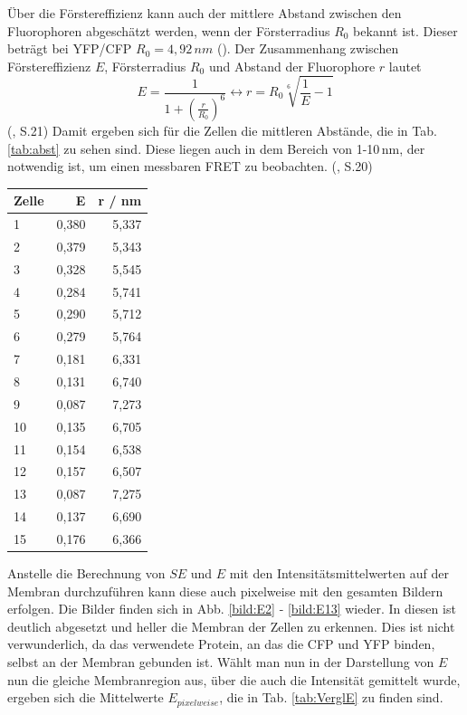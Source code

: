 Über die Förstereffizienz kann auch der mittlere Abstand zwischen den Fluorophoren abgeschätzt werden, wenn der Försterradius $R_0$ bekannt ist. 
Dieser beträgt bei YFP/CFP $R_0 = 4,92\,nm$ (\cite{Patterson2000}). Der Zusammenhang zwischen Förstereffizienz $E$, Försterradius $R_0$ und Abstand der Fluorophore $r$ 
lautet 
\begin{equation*}
    E = \frac{1}{1+(\frac{r}{R_0})^6} \leftrightarrow r = R_0 \sqrt[6]{\frac{1}{E} -1} 
\end{equation*}
(\cite{Zuern2009}, S.21)
Damit ergeben sich für die Zellen die mittleren Abstände, die in Tab. \ref{tab:abst} zu sehen sind. Diese liegen auch in dem Bereich von 
1-10\,nm, der notwendig ist, um einen messbaren FRET zu beobachten. (\cite{Zuern2009}, S.20)

\begin{center}
    \centering
    \begin{tabular}{lrr}
        \toprule
        Zelle &     E &     r / nm \\
        \midrule
        1     & 0,380 & 5,337 \\
        2     & 0,379 & 5,343 \\
        3     & 0,328 & 5,545 \\
        4     & 0,284 & 5,741 \\
        5     & 0,290 & 5,712 \\
        6     & 0,279 & 5,764 \\
        7     & 0,181 & 6,331 \\
        8     & 0,131 & 6,740 \\
        9     & 0,087 & 7,273 \\
        10    & 0,135 & 6,705 \\
        11    & 0,154 & 6,538 \\
        12    & 0,157 & 6,507 \\
        13    & 0,087 & 7,275 \\
        14    & 0,137 & 6,690 \\
        15    & 0,176 & 6,366 \\
        \bottomrule
    \end{tabular}
\end{center}



Anstelle die Berechnung von $SE$ und $E$ mit den Intensitätsmittelwerten auf der Membran durchzuführen kann diese auch pixelweise 
mit den gesamten Bildern erfolgen. Die Bilder finden sich in Abb. \ref{bild:E2} - \ref{bild:E13} wieder. In diesen ist deutlich abgesetzt 
und heller die Membran der Zellen zu erkennen. Dies ist nicht verwunderlich, da das verwendete Protein, an das die CFP und YFP binden, selbst 
an der Membran gebunden ist.
Wählt man nun in der Darstellung von $E$ nun die gleiche 
Membranregion aus, über die auch die Intensität gemittelt wurde, ergeben sich die Mittelwerte $E_{pixelweise}$, die in Tab. \ref{tab:VerglE} 
zu finden sind.

